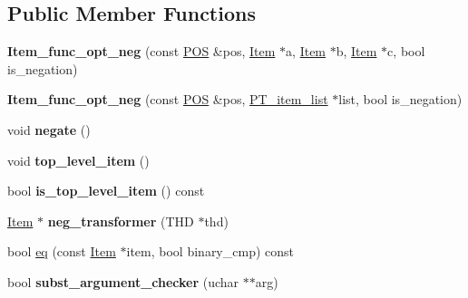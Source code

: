 \subsection*{Public Member Functions}
\begin{DoxyCompactItemize}
\item 
\mbox{\label{classItem__func__opt__neg_aa28c45878d133fa451514114997bab2c}} 
{\bfseries Item\+\_\+func\+\_\+opt\+\_\+neg} (const \mbox{\hyperlink{structYYLTYPE}{P\+OS}} \&pos, \mbox{\hyperlink{classItem}{Item}} $\ast$a, \mbox{\hyperlink{classItem}{Item}} $\ast$b, \mbox{\hyperlink{classItem}{Item}} $\ast$c, bool is\+\_\+negation)
\item 
\mbox{\label{classItem__func__opt__neg_ae706a68f886751bc092d069cb6b70cd3}} 
{\bfseries Item\+\_\+func\+\_\+opt\+\_\+neg} (const \mbox{\hyperlink{structYYLTYPE}{P\+OS}} \&pos, \mbox{\hyperlink{classPT__item__list}{P\+T\+\_\+item\+\_\+list}} $\ast$list, bool is\+\_\+negation)
\item 
\mbox{\label{classItem__func__opt__neg_a25923bd10fa6c3c02e35b4a761bd63ee}} 
void {\bfseries negate} ()
\item 
\mbox{\label{classItem__func__opt__neg_aeeeead8705a8596f7f2fdc0e4577976b}} 
void {\bfseries top\+\_\+level\+\_\+item} ()
\item 
\mbox{\label{classItem__func__opt__neg_a549f13a38f4451d6382e1614b46d6e8f}} 
bool {\bfseries is\+\_\+top\+\_\+level\+\_\+item} () const
\item 
\mbox{\label{classItem__func__opt__neg_aa1ae75e2723ce12ec7e153d1c9d736c7}} 
\mbox{\hyperlink{classItem}{Item}} $\ast$ {\bfseries neg\+\_\+transformer} (T\+HD $\ast$thd)
\item 
bool \mbox{\hyperlink{classItem__func__opt__neg_a7a637b1a83c5f2737350e3630318fa76}{eq}} (const \mbox{\hyperlink{classItem}{Item}} $\ast$item, bool binary\+\_\+cmp) const
\item 
\mbox{\label{classItem__func__opt__neg_a18ca6fcd998f592556a99ecbfaa178d0}} 
bool {\bfseries subst\+\_\+argument\+\_\+checker} (uchar $\ast$$\ast$arg)
\end{DoxyCompactItemize}
